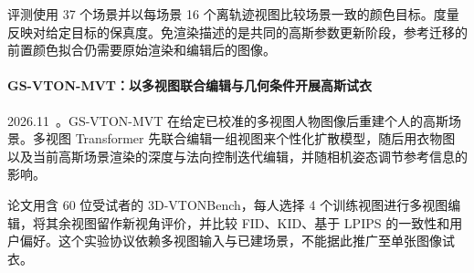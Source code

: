 评测使用 37 个场景并以每场景 16 个离轨迹视图比较场景一致的颜色目标。度量反映对给定目标的保真度。免渲染描述的是共同的高斯参数更新阶段，参考迁移的前置颜色拟合仍需要原始渲染和编辑后的图像。

\paragraph{GS-VTON-MVT：以多视图联合编辑与几何条件开展高斯试衣}
2026.11~\cite{2611_25979}。GS-VTON-MVT 在给定已校准的多视图人物图像后重建个人的高斯场景。多视图 Transformer 先联合编辑一组视图来个性化扩散模型，随后用衣物图以及当前高斯场景渲染的深度与法向控制迭代编辑，并随相机姿态调节参考信息的影响。

论文用含 60 位受试者的 3D-VTONBench，每人选择 4 个训练视图进行多视图编辑，将其余视图留作新视角评价，并比较 FID、KID、基于 LPIPS 的一致性和用户偏好。这个实验协议依赖多视图输入与已建场景，不能据此推广至单张图像试衣。
